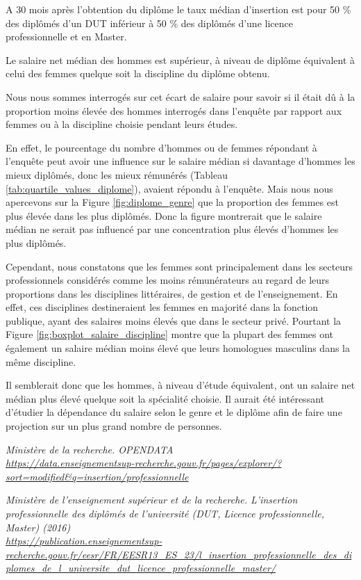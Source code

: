 \documentclass[12pt, a4paper, titlepage, table]{article}
\begin{document}
A 30 mois après l'obtention du diplôme le taux médian d'insertion est pour 50 \% des diplômés d'un DUT inférieur à 50 \% des diplômés d'une licence professionnelle et en Master.  

Le salaire net médian des hommes est supérieur, à niveau de diplôme équivalent à celui des femmes quelque soit la discipline du diplôme obtenu.

Nous nous sommes interrogés sur cet écart de salaire pour savoir si il était dû à la proportion moins élevée des hommes interrogés dans l'enquête par rapport aux femmes ou à la discipline choisie pendant leurs études.

En effet, le pourcentage du nombre d'hommes ou de femmes répondant à l'enquête peut avoir une influence sur le salaire médian si davantage d'hommes les mieux diplômés, donc les mieux rémunérés (Tableau \ref{tab:quartile_values_diplome}), avaient répondu à l'enquête. Mais nous nous apercevons sur la Figure \ref{fig:diplome_genre} que la proportion des femmes est plus élevée dans les plus diplômés. Donc la figure montrerait que le salaire médian ne serait pas influencé par une concentration plus élevés d'hommes les plus diplômés. 

Cependant, nous constatons que les femmes sont principalement dans les secteurs professionnels considérés comme les moins rémunérateurs au regard de leurs proportions dans les disciplines littéraires, de gestion et de l'enseignement. En effet, ces disciplines destineraient les femmes en majorité dans la fonction publique, ayant des salaires moins élevés que dans le secteur privé.
Pourtant la Figure \ref{fig:boxplot_salaire_discipline} montre que la plupart des femmes ont également un salaire médian moins élevé que leurs homologues masculins dans la même discipline.

Il semblerait donc que les hommes, à niveau d'étude équivalent, ont un salaire net médian plus élevé quelque soit la spécialité choisie.
Il aurait été intéressant d'étudier la dépendance du salaire selon le genre et le diplôme afin de faire une projection sur un plus grand nombre de personnes. 


\newpage

\begin{thebibliography}{9}
	\textit{Ministère de la recherche. OPENDATA}\\
	\textit{\url{https://data.enseignementsup-recherche.gouv.fr/pages/explorer/?sort=modified&q=insertion/professionnelle}}
	
	\textit{Ministère de l'enseignement supérieur et de la recherche. L'insertion professionnelle des diplômés de l'université (DUT, Licence professionnelle, Master) (2016)} \\
	\textit{\url{https://publication.enseignementsup-recherche.gouv.fr/eesr/FR/EESR13_ES_23/l_insertion_professionnelle_des_diplomes_de_l_universite_dut_licence_professionnelle_master/}}
	
\end{thebibliography}
\end{document}
